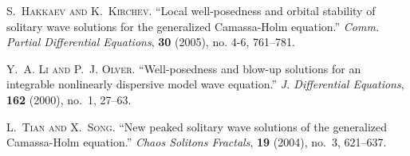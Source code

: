 \documentclass[12pt,reqno]{amsart}
\theoremstyle{plain}  %
\begin{document}
		
	\begin{thebibliography}{1}
\newcommand{\enquote}[1]{``#1''}

\textsc{S.~Hakkaev and K.~Kirchev}.
\newblock \enquote{Local well-posedness and orbital stability of solitary wave
  solutions for the generalized {C}amassa-{H}olm equation.}
\newblock \emph{Comm. Partial Differential Equations}, \textbf{30} (2005), no.
  4-6, 761--781.

\textsc{Y.~A. Li and P.~J. Olver}.
\newblock \enquote{Well-posedness and blow-up solutions for an integrable
  nonlinearly dispersive model wave equation.}
\newblock \emph{J. Differential Equations}, \textbf{162} (2000), no.~1, 27--63.

\textsc{L.~Tian and X.~Song}.
\newblock \enquote{New peaked solitary wave solutions of the generalized
  {C}amassa-{H}olm equation.}
\newblock \emph{Chaos Solitons Fractals}, \textbf{19} (2004), no.~3, 621--637.

\end{thebibliography}	
				  
			  
				  

				  





				  
\end{document}
